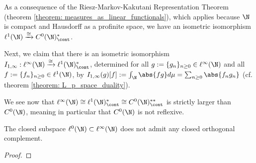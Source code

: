         \begin{example} \label{example: continuous_duals_of_convergent_sequence_spaces}
            As a consequence of the Riesz-Markov-Kakutani Representation Theorem (theorem \ref{theorem: measures_as_linear_functionals}), which applies because $\N$ is compact and Hausdorff as a profinite space, we have an isometric isomorphism $\ell^1(\N) \xrightarrow[]{\cong} C^0(\N)^*_{\cont}$.
            
            Next, we claim that there is an isometric isomorphism $I_{1, \infty}: \ell^{\infty}(\N) \xrightarrow[]{\cong} \ell^1(\N)^*_{\cont}$, determined for all $g := \{g_n\}_{n \geq 0} \in \ell^{\infty}(\N)$ and all $f := \{f_n\}_{n \geq 0} \in \ell^1(\N)$, by $I_{1, \infty}(g)[f] := \int_{\N} \abs{fg} d\mu = \sum_{n \geq 0} \abs{ f_n g_n }$ (cf. theorem \ref{theorem: L_p_space_duality}). 
                
            We see now that $\ell^{\infty}(\N) \cong \ell^1(\N)^*_{\cont} \cong C^0(\N)^{**}_{\cont}$ is strictly larger than $C^0(\N)$, meaning in particular that $C^0(\N)$ is not reflexive. 
        \end{example}
        \begin{example}
            The closed subspace $\ell^0(\N) \subset \ell^{\infty}(\N)$ does not admit any closed orthogonal complement.
        \end{example}
            \begin{proof}
                
            \end{proof}

